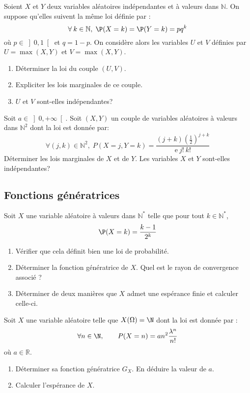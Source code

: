 \documentclass[a4paper,twoside,french,11pt]{VcCours}
\begin{document}
\begin{Exercice}{} Soient $X$ et $Y$ deux variables aléatoires indépendantes et à valeurs dans $\mathbb{N}$. On suppose qu'elles suivent la même loi définie par :
$$\forall\:k\in\mathbb{N}, \; \P(X=k)=\P(Y=k)=pq^k$$
où $p \in \left] 0,1\right[$ et $q=1-p$. On considère alors les variables $U$ et $V$ définies par $U=\max(X,Y)$ et $V=\max(X,Y)$.
\begin{enumerate}
\item
Déterminer la loi du couple $(U,V)$.
\item
Expliciter les lois marginales de ce couple.
\item
$U$ et $V$ sont-elles indépendantes?
\end{enumerate}
\end{Exercice}


\begin{Exercice}{} Soit $a\in {\left] 0,+\infty\right[ }$. Soit $(X,Y)$ un couple de variables aléatoires à valeurs dans $\mathbb{N}^2$ dont la loi est donnée par: 
$$\forall (j,k)\in {\mathbb{N}^2}, \; P(X=j,Y=k)=\dfrac{(j+k)\left( \tfrac{1}{2}\right) ^{j+k}}{\mathrm{e}\:j!\:k!}$$
Déterminer les lois marginales de $X$ et de $Y$. Les variables $X$ et $Y$ sont-elles indépendantes?
\end{Exercice}



\subsection{Fonctions génératrices}


\begin{Exercice}{}  Soit $X$ une variable aléatoire à valeurs dans $\mathbb{N}^*$ telle que pour tout $k \in \mathbb{N}^*$,
$$ \P(X=k) = \dfrac{k-1}{2^k}$$

\begin{enumerate}
\item Vérifier que cela définit bien une loi de probabilité.
\item Déterminer la fonction génératrice de $X$. Quel est le rayon de convergence associé ?
\item Déterminer de deux manières que $X$ admet une espérance finie et calculer celle-ci.
\end{enumerate}
\end{Exercice}

\begin{Exercice}{} Soit $X$ une variable aléatoire telle que $X(\Omega)=\N$ dont la loi est donnée par :
$$\forall n\in\N,\qquad P(X=n)=an^2\frac{\lambda^n}{n!}$$
où $a \in \mathbb{R}$.
\begin{enumerate}
	\item Déterminer sa fonction génératrice $G_X.$ En déduire la valeur de $a.$
	
	\item Calculer l'espérance de $X.$
\end{enumerate}
\end{Exercice}
\end{document}
